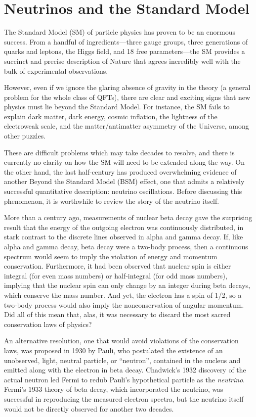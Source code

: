\documentclass[../thesis.tex]{subfiles}
\begin{document}
\section{Neutrinos and the Standard Model}
\label{sec:neuAndSM}

The Standard Model (SM) of particle physics has proven to be an enormous success. From a handful of ingredients---three gauge groups, three generations of quarks and leptons, the Higgs field, and 18 free parameters---the SM provides a succinct and precise description of Nature that agrees incredibly well with the bulk of experimental observations.

However, even if we ignore the glaring absence of gravity in the theory (a general problem for the whole class of QFTs), there are clear and exciting signs that new physics must lie beyond the Standard Model. For instance, the SM fails to explain dark matter, dark energy, cosmic inflation, the lightness of the electroweak scale, and the matter/antimatter asymmetry of the Universe, among other puzzles.

These are difficult problems which may take decades to resolve, and there is currently no clarity on how the SM will need to be extended along the way. On the other hand, the last half-century has produced overwhelming evidence of another Beyond the Standard Model (BSM) effect, one that admits a relatively successful quantitative description: neutrino oscillations. Before discussing this phenomenon, it is worthwhile to review the story of the neutrino itself. 

More than a century ago, measurements of nuclear beta decay gave the surprising result that the energy of the outgoing electron was continuously distributed, in stark contrast to the discrete lines observed in alpha and gamma decay. If, like alpha and gamma decay, beta decay were a two-body process, then a continuous spectrum would seem to imply the violation of energy and momentum conservation. Furthermore, it had been observed that nuclear spin is either integral (for even mass numbers) or half-integral (for odd mass numbers), implying that the nuclear spin can only change by an integer during beta decays, which conserve the mass number. And yet, the electron has a spin of 1/2, so a two-body process would also imply the nonconservation of angular momentum. Did all of this mean that, alas, it was necessary to discard the most sacred conservation laws of physics?

An alternative resolution, one that would avoid violations of the conservation laws, was proposed in 1930 by Pauli, who postulated the existence of an unobserved, light, neutral particle, or ``neutron'', contained in the nucleus and emitted along with the electron in beta decay. Chadwick's 1932 discovery of the actual neutron led Fermi to redub Pauli's hypothetical particle as the \emph{neutrino}. Fermi's 1933 theory of beta decay, which incorporated the neutrino, was successful in reproducing the measured electron spectra, but the neutrino itself would not be directly observed for another two decades.
\end{document}

